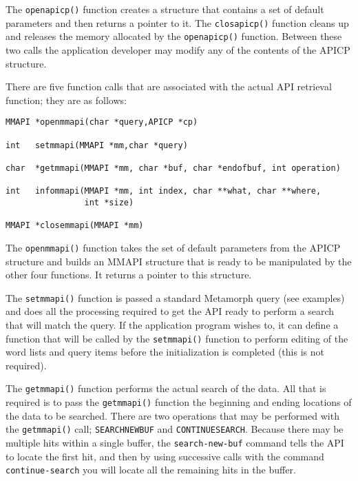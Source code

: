 The \verb`openapicp()` function creates a structure that contains a set
of default parameters and then returns a pointer to it.  The
\verb`closapicp()` function cleans up and releases the memory allocated
by the \verb`openapicp()` function.  Between these two calls the
application developer may modify any of the contents of the APICP
structure.

There are five function calls that are associated with the actual
API retrieval function; they are as follows:

\begin{verbatim}
MMAPI *openmmapi(char *query,APICP *cp)

int   setmmapi(MMAPI *mm,char *query)

char  *getmmapi(MMAPI *mm, char *buf, char *endofbuf, int operation)

int   infommapi(MMAPI *mm, int index, char **what, char **where,
                int *size)

MMAPI *closemmapi(MMAPI *mm)
\end{verbatim}

The \verb`openmmapi()` function takes the set of default parameters from
the APICP structure and builds an MMAPI structure that is ready to
be manipulated by the other four functions.  It returns a pointer
to this structure.

The \verb`setmmapi()` function is passed a standard Metamorph query (see
examples) and does all the processing required to get the API
ready to perform a search that will match the query.  If the
application program wishes to, it can define a function that will
be called by the \verb`setmmapi()` function to perform editing of the
word lists and query items before the initialization is completed
(this is not required).

The \verb`getmmapi()` function performs the actual search of the data.
All that is required is to pass the \verb`getmmapi()` function the
beginning and ending locations of the data to be searched.  There
are two operations that may be performed with the \verb`getmmapi()` call;
\verb`SEARCHNEWBUF` and \verb`CONTINUESEARCH`.  Because there may be multiple
hits within a single buffer, the \verb`search-new-buf` command tells the
API to locate the first hit, and then by using successive calls
with the command \verb`continue-search` you will locate all the remaining
hits in the buffer.

